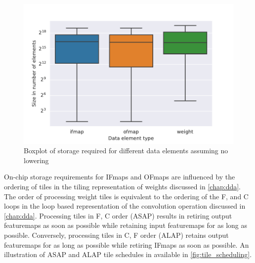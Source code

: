 \begin{figure}[]
    \centering
    \includegraphics[scale=0.7]{Plots/storage/no_lowering.pdf}
    \caption{Boxplot of storage required for different data elements assuming no lowering}
    \label{fig:storage:no_lowering}
\end{figure}


On-chip storage requirements for IFmaps and OFmaps are influenced by the
ordering of tiles in the tiling representation of weights discussed in
\autoref{chap:dda}. The order of processing weight tiles is equivalent to the
ordering of the F, and C loops in the loop based representation of the
convolution operation discussed in \autoref{chap:dda}. Processing tiles in F, C
order (ASAP) results in retiring output featuremaps as soon as possible while retaining
input featuremaps for as long as possible. Conversely, processing tiles in C, F
order (ALAP) retains output featuremaps for as long as possible while retiring IFmaps
as soon as possible. An illustration of ASAP and ALAP tile schedules in
available in \autoref{fig:tile_scheduling}. 

